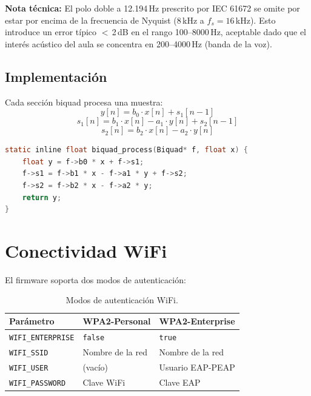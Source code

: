 \documentclass[11pt,a4paper,openany]{report}
\begin{document}
\textbf{Nota t\'ecnica:} El polo doble a 12{.}194\,Hz prescrito por IEC 61672 se omite por estar por encima de la frecuencia de Nyquist (8\,kHz a $f_s = 16$\,kHz). Esto introduce un error t\'ipico $<$\,2\,dB en el rango 100--8000\,Hz, aceptable dado que el inter\'es ac\'ustico del aula se concentra en 200--4000\,Hz (banda de la voz).

\subsection{Implementaci\'on}

Cada secci\'on biquad procesa una muestra:
\begin{equation}
y[n] = b_0 \cdot x[n] + s_1[n-1]
\end{equation}
\begin{equation}
s_1[n] = b_1 \cdot x[n] - a_1 \cdot y[n] + s_2[n-1]
\end{equation}
\begin{equation}
s_2[n] = b_2 \cdot x[n] - a_2 \cdot y[n]
\end{equation}

\begin{lstlisting}[language=C, caption={Procesado biquad (firmware/src/dsp.h)}]
static inline float biquad_process(Biquad* f, float x) {
    float y = f->b0 * x + f->s1;
    f->s1 = f->b1 * x - f->a1 * y + f->s2;
    f->s2 = f->b2 * x - f->a2 * y;
    return y;
}
\end{lstlisting}

\section{Conectividad WiFi}

El firmware soporta dos modos de autenticaci\'on:

\begin{table}[H]
\centering
{}
\begin{tabularx}{\textwidth}{l X X}
\toprule
\rowcolor{TableHead}
\textbf{Par\'ametro} & \textbf{WPA2-Personal} & \textbf{WPA2-Enterprise} \\ \midrule
\texttt{WIFI\_ENTERPRISE} & \texttt{false}     & \texttt{true} \\
\texttt{WIFI\_SSID}       & Nombre de la red   & Nombre de la red \\
\texttt{WIFI\_USER}       & (vac\'io)          & Usuario EAP-PEAP \\
\texttt{WIFI\_PASSWORD}   & Clave WiFi         & Clave EAP \\ \bottomrule
\end{tabularx}
\caption{Modos de autenticaci\'on WiFi.}
\end{table}
\end{document}
